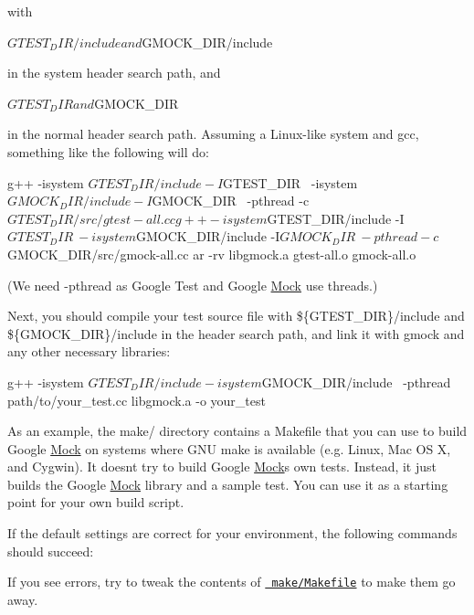 with \begin{DoxyVerb}${GTEST_DIR}/include and ${GMOCK_DIR}/include
\end{DoxyVerb}


in the system header search path, and \begin{DoxyVerb}${GTEST_DIR} and ${GMOCK_DIR}
\end{DoxyVerb}


in the normal header search path. Assuming a Linux-\/like system and gcc, something like the following will do\+: \begin{DoxyVerb}g++ -isystem ${GTEST_DIR}/include -I${GTEST_DIR} \
    -isystem ${GMOCK_DIR}/include -I${GMOCK_DIR} \
    -pthread -c ${GTEST_DIR}/src/gtest-all.cc
g++ -isystem ${GTEST_DIR}/include -I${GTEST_DIR} \
    -isystem ${GMOCK_DIR}/include -I${GMOCK_DIR} \
    -pthread -c ${GMOCK_DIR}/src/gmock-all.cc
ar -rv libgmock.a gtest-all.o gmock-all.o
\end{DoxyVerb}


(We need -\/pthread as Google Test and Google \mbox{\hyperlink{class_mock}{Mock}} use threads.)

Next, you should compile your test source file with \$\{G\+T\+E\+S\+T\+\_\+\+D\+IR\}/include and \$\{G\+M\+O\+C\+K\+\_\+\+D\+IR\}/include in the header search path, and link it with gmock and any other necessary libraries\+: \begin{DoxyVerb}g++ -isystem ${GTEST_DIR}/include -isystem ${GMOCK_DIR}/include \
    -pthread path/to/your_test.cc libgmock.a -o your_test
\end{DoxyVerb}


As an example, the make/ directory contains a Makefile that you can use to build Google \mbox{\hyperlink{class_mock}{Mock}} on systems where G\+NU make is available (e.\+g. Linux, Mac OS X, and Cygwin). It doesn\textquotesingle{}t try to build Google \mbox{\hyperlink{class_mock}{Mock}}\textquotesingle{}s own tests. Instead, it just builds the Google \mbox{\hyperlink{class_mock}{Mock}} library and a sample test. You can use it as a starting point for your own build script.

If the default settings are correct for your environment, the following commands should succeed\+: 


If you see errors, try to tweak the contents of \href{make/Makefile}{\texttt{ make/\+Makefile}} to make them go away.

